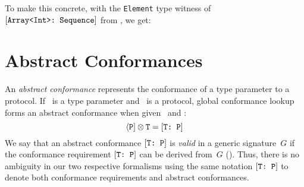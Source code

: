 \documentclass[../generics]{subfiles}
\begin{document}
To make this concrete, with the \texttt{Element} type witness of $[\texttt{Array<Int>:~Sequence}]$ from , we get:
\begin{center}
\end{center}

\section{Abstract Conformances}\label{abstract conformances}

An \emph{abstract conformance} represents the conformance of a type parameter to a protocol. If \tT\ is a type parameter and \tP\ is a protocol, global conformance lookup forms an abstract conformance when given \tT\ and \tP:
\[\langle\texttt{P}]\otimes\texttt{T} = [\texttt{T:~P}]\]
We say that an abstract conformance $[\texttt{T:~P}]$ is \emph{valid} in a generic signature~$G$ if the conformance requirement $[\texttt{T:~P}]$ can be derived from~$G$ (). Thus, there is no ambiguity in our two respective formalisms using the same notation $[\texttt{T:~P}]$ to denote both conformance requirements and abstract conformances.
\end{document}

